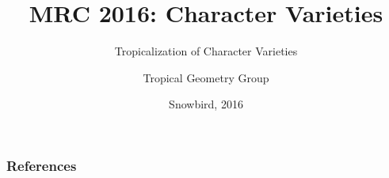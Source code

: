 \documentclass{beamer}
\begin{document}
\title[Tropicalization of Character Varieties]
{MRC 2016: Character Varieties}
\subtitle{Tropicalization of Character Varieties}
\author[TGG]{Tropical Geometry Group}
\date[Snowbird 2016] %
{Snowbird, 2016}
\subject{character varieties, tropical geometry}
\frame{\titlepage}



% 
% 
% 

\begin{frame}[allowframebreaks]
  \frametitle{References}
  \cite{*}%
\end{frame}
\end{document}
